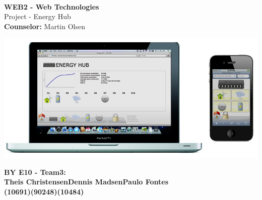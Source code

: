 
\begin{centering}
\thispagestyle{empty} %
\begin{center}
\vspace{5cm}
\textbf{\Huge {\\ \vspace{1cm}WEB2 - Web Technologies}}\\
\huge {Project - Energy Hub}\\ \vspace{0.5cm}
\large{\textbf{Counselor:} Martin Olsen}\\ \vspace{1.5cm}
\end{center}

\centering
\includegraphics[width=1.0\textwidth]{images/frontpage.png}
 \end{centering}
\vspace{1.5cm}
\begin{center}
\vspace{0.4cm}
\Large{\textbf{BY E10 - Team3: \\ \vspace{0.2cm}Theis Christensen\hspace{1.5cm}Dennis Madsen\hspace{1.5cm}Paulo Fontes}
\\\textbf{(10691)\hspace{3.7cm}(90248)\hspace{3.7cm}(10484)}}
\end{center}